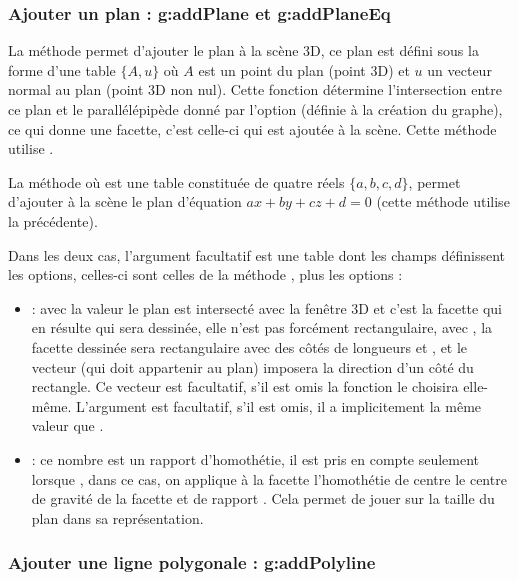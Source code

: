 \subsubsection{Ajouter un plan : g:addPlane et g:addPlaneEq}

La méthode  permet d'ajouter le plan  à la scène 3D, ce plan est défini sous la forme d'une table $\{A,u\}$ où $A$ est un point du plan (point 3D) et $u$ un vecteur normal au plan (point 3D non nul). Cette fonction détermine l'intersection entre ce plan et le parallélépipède donné par l'option  (définie à la création du graphe), ce qui donne une facette, c'est celle-ci qui est ajoutée à la scène. Cette méthode utilise .

La méthode  où  est une table constituée de quatre réels $\{a,b,c,d\}$, permet d'ajouter à la scène le plan d'équation $ax+by+cz+d=0$ (cette méthode utilise la précédente).

Dans les deux cas, l'argument facultatif  est une table dont les champs définissent les options, celles-ci sont celles de la méthode , plus les options :

\begin{itemize}
    \item {} : avec la valeur \nil le plan est intersecté avec la fenêtre 3D et c'est la facette qui en résulte qui sera dessinée, elle n'est pas forcément rectangulaire, avec , la facette dessinée sera rectangulaire avec des côtés de longueurs  et , et le vecteur  (qui doit appartenir au plan) imposera la direction d'un côté du rectangle. Ce vecteur  est facultatif, s'il est omis la fonction le choisira elle-même. L'argument  est facultatif, s'il est omis, il a implicitement la même valeur que .
    
    \item {} : ce nombre est un rapport d'homothétie, il est pris en compte seulement lorsque , dans ce cas, on applique à la facette l'homothétie de centre le centre de gravité de la facette et de rapport . Cela permet de jouer sur la taille du plan dans sa représentation.
\end{itemize}

        

\subsubsection{Ajouter une ligne polygonale : g:addPolyline}

